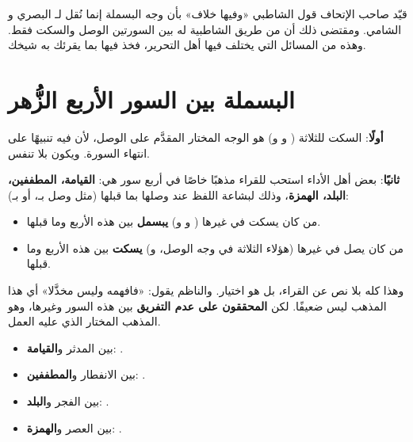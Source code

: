 \begin{tahrir}
\medskip
قيّد صاحب الإتحاف قول الشاطبي «وفيها خلاف» بأن وجه البسملة إنما نُقل لـ\AbiAmr{} البصري و\IbnAmir{} الشامي. ومقتضى ذلك أن \Warsh{} من طريق الشاطبية له بين السورتين الوصل والسكت فقط.
وهذه من المسائل التي يختلف فيها أهل التحرير، فخذ فيها بما يقرئك به شيخك.
\end{tahrir}

\section{البسملة بين السور الأربع الزُّهر}

\begin{mufradat}
\end{mufradat}
\maana[(البيتان ١٠٣–١٠٤)]
\textbf{أولًا}: السكت للثلاثة (\Warsh{} و\AbuAmr{} و\IbnAmir) هو الوجه المختار المقدَّم على الوصل، لأن فيه تنبيهًا على انتهاء السورة. ويكون بلا تنفس.

\textbf{ثانيًا}: بعض أهل الأداء استحب للقراء مذهبًا خاصًا في أربع سور هي: \textbf{القيامة، المطففين، البلد، الهمزة}، وذلك لبشاعة اللفظ عند وصلها بما قبلها (مثل وصل  بـ، أو  بـ):
\begin{itemize}
\item من كان يسكت في غيرها (\Warsh{} و\AbuAmr{} و\IbnAmir) \ila{} \textbf{يبسمل} بين هذه الأربع وما قبلها.
\item من كان يصل في غيرها (هؤلاء الثلاثة في وجه الوصل، و\Hamza) \ila{} \textbf{يسكت} بين هذه الأربع وما قبلها.
\end{itemize}
وهذا كله بلا نص عن القراء، بل هو اختيار. والناظم يقول: «فافهمه وليس مخذَّلا» أي هذا المذهب ليس ضعيفًا. لكن \textbf{المحققون على عدم التفريق} بين هذه السور وغيرها، وهو المذهب المختار الذي عليه العمل.

\begin{amthila}
\begin{itemize}
\item بين المدثر و\textbf{القيامة}: .
\item بين الانفطار و\textbf{المطففين}: .
\item بين الفجر و\textbf{البلد}: .
\item بين العصر و\textbf{الهمزة}: .
\end{itemize}
\end{amthila}

